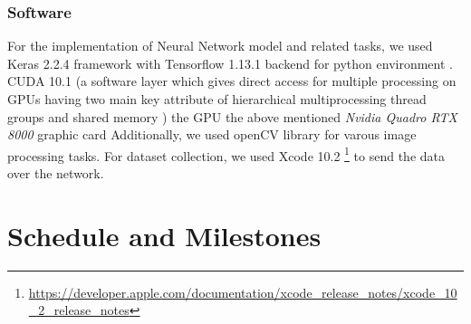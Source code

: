 \subsubsection{Software} 
\label{Chapter4:Software_i}
For the implementation of Neural Network model and related tasks, we used Keras 2.2.4 framework with Tensorflow 1.13.1  backend for python environment \cite{tensorflow2015-whitepaper}. CUDA 10.1 (a software layer which gives direct access for multiple processing on GPUs having two main key attribute of hierarchical multiprocessing thread groups and shared memory \cite{nickolls2008scalable}) the GPU  the above mentioned  \textit{Nvidia Quadro RTX 8000} graphic card  Additionally, we used openCV library \cite{opencv_library} for varous image processing tasks. For dataset collection, we used Xcode 10.2 \footnote{\url{https://developer.apple.com/documentation/xcode_release_notes/xcode_10_2_release_notes}} to send the data over the network.



\newpage








\section{Schedule and Milestones}

